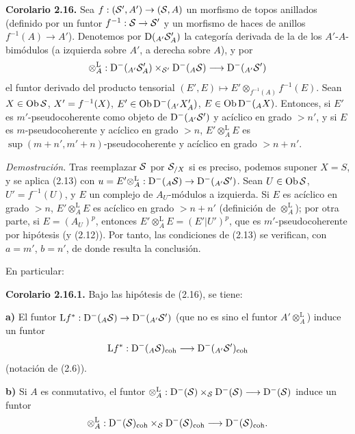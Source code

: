 \textbf{Corolario 2.16.} Sea \(f:(\sisi{S'}{\mathcal S'},A')\to(\sisi{S}{\mathcal S},A)\) un morfismo de topos anillados (definido por un funtor \(f^{-1}:\sisi{S}{\mathcal S}\to \sisi{S'}{\mathcal S'}\) y un morfismo de haces de anillos \(f^{-1}(A)\to A'\)). Denotemos por \(\Dpx({}_{A'}\sisi{S'}{\mathcal S'}_A)\) la categoría derivada de la de los \(A'\)-\(A\)-bimódulos (a izquierda sobre \(A'\), a derecha sobre \(A\)), y por
\[
  \otimes_A^{\mathrm L}:\Dpx^-(_{A'}\sisi{S'}{\mathcal S'}_A)\times_{\sisi{S'}{\mathcal S'}}\Dpx^-(_A \sisi{S}{\mathcal S})
  \longrightarrow \Dpx^-(_{A'}\sisi{S'}{\mathcal S'})
\]
el funtor derivado del producto tensorial \((E',E)\longmapsto E'\otimes_{f^{-1}(A)} f^{-1}(E)\). Sean \(X\in\Ob \sisi{S}{\mathcal S}\), \(X'=\sisi{u(X)}{f^{-1}(X)}\), \(E'\in\Ob\Dpx^-(_{A'}X'_A)\), \(E\in\Ob\Dpx^-(_A X)\). Entonces, si \(E'\) es \(m'\)-pseudocoherente como objeto de \(\Dpx^-(\sisi{_A}{_{A'}} \sisi{S'}{\mathcal S'})\) y acíclico en grado \(>n'\), y si \(E\) es \(m\)-pseudocoherente y acíclico en grado \(>n\), \(E'\otimes_A^{\mathrm L}E\) es \(\sup(m+n',m'+n)\)-pseudocoherente y acíclico en grado \(>n+n'\).

\emph{Demostración.} Tras reemplazar \(\sisi{S}{\mathcal S}\) por \(\sisi{S_{/X}}{\mathcal S_{/X}}\) si es preciso, podemos suponer \(X=S\), y se aplica (2.13) con \(u=E'\otimes_A^{\mathrm L}:\Dpx^-(_A \sisi{S}{\mathcal S})\to\Dpx^-(_{A'}\sisi{S'}{\mathcal S'})\). Sean \(U\in\Ob \sisi{S}{\mathcal S}\), \(U'=f^{-1}(U)\), y \(E\) un complejo de \(A_U\)-módulos a izquierda. Si \(E\) es acíclico en grado \(>n\), \(E'\otimes_A^{\mathrm L}E\) es acíclico en grado \(>n+n'\) (definición de \(\otimes_A^{\mathrm L}\)); por otra parte, si \(E=(A_U)^p\), entonces \(E'\otimes_A^{\mathrm L}E=(E'|U')^p\), que es \(m'\)-pseudocoherente por hipótesis (y (2.12)). Por tanto, las condiciones de (2.13) se verifican, con \(a=m'\), \(b=n'\), de donde resulta la conclusión.

En particular:

\textbf{Corolario 2.16.1.} Bajo las hipótesis de (2.16), se tiene:

\textbf{a)} El funtor \(\mathrm Lf^*: \Dpx^-(_A \sisi{S}{\mathcal S})\to \Dpx^-(_{A'}\sisi{S'}{\mathcal S'})\) (que no es sino el funtor \(A'\otimes_A^{\mathrm L}\)) induce un funtor
\[
  \mathrm Lf^*: \Dpx^-(_A \sisi{S}{\mathcal S})_{\coh}\longrightarrow \Dpx^-(_{A'}\sisi{S'}{\mathcal S'})_{\coh}
\]
(notación de (2.6)).

\textbf{b)} Si \(A\) es conmutativo, el funtor \(\otimes_A^{\mathrm L}:\Dpx^-(\sisi{S}{\mathcal S})\times\sisi{_S}{_{\mathcal S}}\Dpx^-(\sisi{S}{\mathcal S})\longrightarrow \Dpx^-(\sisi{S}{\mathcal S})\) induce un funtor
\[
  \otimes_A^{\mathrm L}:\Dpx^-(\sisi{S}{\mathcal S})_{\coh}\times\sisi{_S}{_{\mathcal S}}\Dpx^-(\sisi{S}{\mathcal S})_{\coh}
  \longrightarrow \Dpx^-(\sisi{S}{\mathcal S})_{\coh} .
\]

